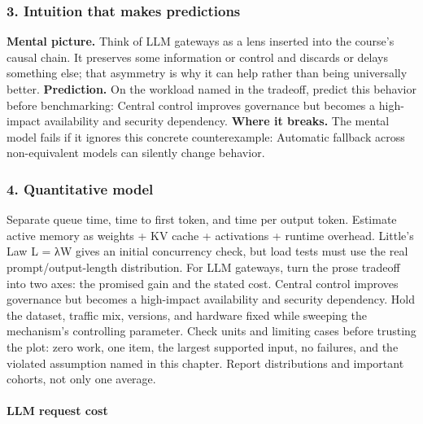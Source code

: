 \subsubsection*{3. Intuition that makes predictions}
\textbf{Mental picture.} Think of LLM gateways as a lens inserted into the course's causal chain. It preserves some information or control and discards or delays something else; that asymmetry is why it can help rather than being universally better.
\textbf{Prediction.} On the workload named in the tradeoff, predict this behavior before benchmarking: Central control improves governance but becomes a high-impact availability and security dependency.
\textbf{Where it breaks.} The mental model fails if it ignores this concrete counterexample: Automatic fallback across non-equivalent models can silently change behavior.
\subsubsection*{4. Quantitative model}
Separate queue time, time to first token, and time per output token. Estimate active memory as weights + KV cache + activations + runtime overhead. Little's Law L = λW gives an initial concurrency check, but load tests must use the real prompt/output-length distribution.
For LLM gateways, turn the prose tradeoff into two axes: the promised gain and the stated cost. Central control improves governance but becomes a high-impact availability and security dependency. Hold the dataset, traffic mix, versions, and hardware fixed while sweeping the mechanism's controlling parameter.
Check units and limiting cases before trusting the plot: zero work, one item, the largest supported input, no failures, and the violated assumption named in this chapter. Report distributions and important cohorts, not only one average.
\paragraph{LLM request cost}
